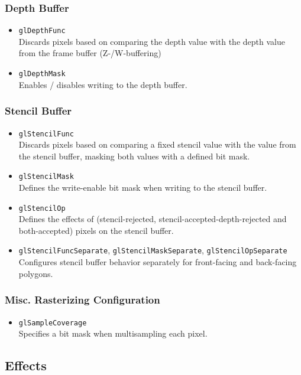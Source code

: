 \documentclass[12pt]{article}
\begin{document}
\subsubsection{Depth Buffer}
\begin{itemize}
\item \texttt{glDepthFunc} \\
	Discards pixels based on comparing the depth value with the depth value from the frame buffer (Z-/W-buffering)
\item \texttt{glDepthMask} \\
	Enables / disables writing to the depth buffer.
\end{itemize}

\subsubsection{Stencil Buffer}
\begin{itemize}
\item \texttt{glStencilFunc} \\
	Discards pixels based on comparing a fixed stencil value with the value from the stencil buffer, masking both values with a defined bit mask.
\item \texttt{glStencilMask} \\
	Defines the write-enable bit mask when writing to the stencil buffer.
\item \texttt{glStencilOp} \\
	Defines the effects of (stencil-rejected, stencil-accepted-depth-rejected and both-accepted) pixels on the stencil buffer.
\item \texttt{glStencilFuncSeparate}, \texttt{glStencilMaskSeparate}, \texttt{glStencilOpSeparate} \\
	Configures stencil buffer behavior separately for front-facing and back-facing polygons.
\end{itemize}

\subsubsection{Misc. Rasterizing Configuration}
\begin{itemize}
\item \texttt{glSampleCoverage} \\
	Specifies a bit mask when multisampling each pixel.
\end{itemize}



\subsection{Effects}
\end{document}
